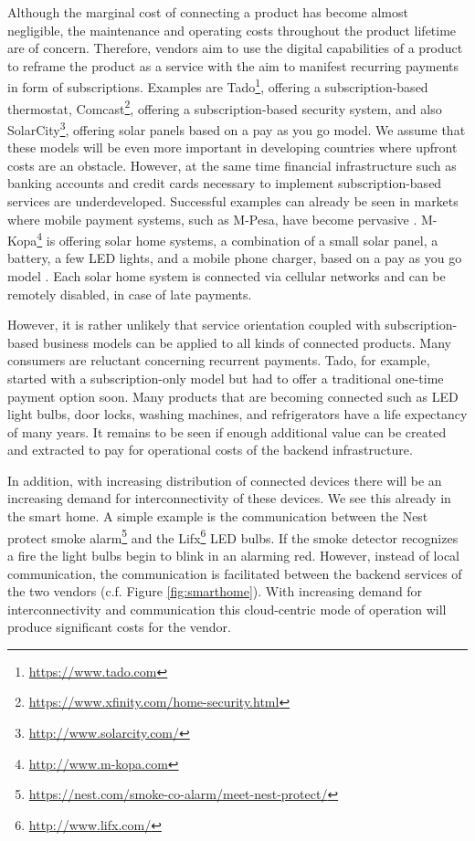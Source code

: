 Although the marginal cost of connecting a product has become almost negligible, the maintenance and operating costs throughout the product lifetime are of concern. Therefore, vendors aim to use the digital capabilities of a product to reframe the product as a service with the aim to manifest recurring payments in form of subscriptions. Examples are Tado\footnote{\url{https://www.tado.com}}, offering a subscription-based thermostat, Comcast\footnote{\url{https://www.xfinity.com/home-security.html}}, offering a subscription-based security system, and also SolarCity\footnote{\url{http://www.solarcity.com/}}, offering solar panels based on a pay as you go model. We assume that these models will be even more important in developing countries where upfront costs are an obstacle. However, at the same time financial infrastructure such as banking accounts and credit cards necessary to implement subscription-based services are underdeveloped. Successful examples can already be seen in markets where mobile payment systems, such as M-Pesa, have become pervasive \parencite{hughes2007m}. M-Kopa\footnote{\url{http://www.m-kopa.com}} is offering solar home systems, a combination of a small solar panel, a battery, a few LED lights, and a mobile phone charger, based on a pay as you go model \parencite{ISI:000351842100012}. Each solar home system is connected via cellular networks and can be remotely disabled, in case of late payments. 

However, it is rather unlikely that service orientation coupled with subscription-based business models can be applied to all kinds of connected products. Many consumers are reluctant concerning recurrent payments. Tado, for example, started with a subscription-only model but had to offer a traditional one-time payment option soon. Many products that are becoming connected such as LED light bulbs, door locks, washing machines, and refrigerators have a life expectancy of many years. It remains to be seen if enough additional value can be created and extracted to pay for operational costs of the backend infrastructure.

In addition, with increasing distribution of connected devices there will be an increasing demand for interconnectivity of these devices. We see this already in the smart home. A simple example is the communication between the Nest protect smoke alarm\footnote{\url{https://nest.com/smoke-co-alarm/meet-nest-protect/}} and the Lifx\footnote{\url{http://www.lifx.com/}} LED bulbs. If the smoke detector recognizes a fire the light bulbs begin to blink in an alarming red. However, instead of local communication, the communication is facilitated between the backend services of the two vendors (c.f. Figure \ref{fig:smarthome}). With increasing demand for interconnectivity and communication this cloud-centric mode of operation will produce significant costs for the vendor.

